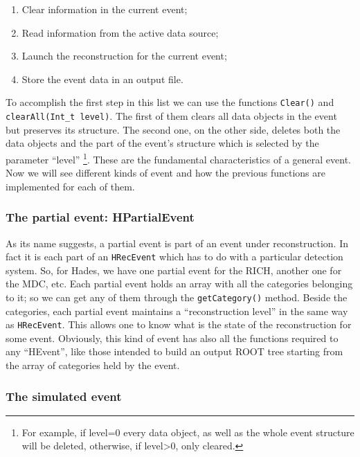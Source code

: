 \begin{enumerate}
\item Clear information in the current event; 
\item Read information from the active data source; 
\item Launch the reconstruction for the current event; 
\item Store the event data in an output file. 
\end{enumerate}

To accomplish the first step in this list we can use the functions 
\verb+Clear()+ and \newline \verb+clearAll(Int_t level)+. The first of them 
clears all data objects in the event but preserves its structure. 
The second one, on the other side, deletes both the data objects 
and the part of the event's structure which is selected by the 
parameter ``level'' \footnote{ For example, if level=0 every 
data object, as well as the whole event structure will be deleted, 
otherwise, if level>0, only cleared.}.
These are the fundamental characteristics of a general event. Now 
we will see different kinds of event and how the previous functions 
are implemented for each of them. 


\subsubsection{The partial event: HPartialEvent}

As its name suggests, a partial event is part of an event under 
reconstruction. In fact it is each part of an \verb+HRecEvent+ which 
has to do with a particular detection system. So, for Hades, we 
have one partial event for the RICH, another one for the MDC, etc.
Each partial event holds an array with all the categories belonging 
to it; so we can get any of them through the \verb+getCategory()+ method.
Beside the categories, each partial event maintains a ``reconstruction level'' 
in the same way as \verb+HRecEvent+. This allows one to know what is the 
state of the reconstruction for some event.
Obviously, this kind of event has also all the functions required to 
any ``HEvent'', like those intended to build an output ROOT tree 
starting from the array of categories held by the event.

\subsubsection{The simulated event}

